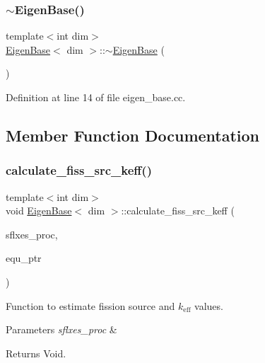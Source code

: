 \subsubsection{\texorpdfstring{$\sim$\+Eigen\+Base()}{~EigenBase()}}
{\footnotesize\ttfamily template$<$int dim$>$ \\
\hyperlink{class_eigen_base}{Eigen\+Base}$<$ dim $>$\+::$\sim$\hyperlink{class_eigen_base}{Eigen\+Base} (\begin{DoxyParamCaption}{ }\end{DoxyParamCaption})\hspace{0.3cm}{\ttfamily [virtual]}}



Definition at line 14 of file eigen\+\_\+base.\+cc.



\subsection{Member Function Documentation}
\mbox{\label{class_eigen_base_a325ceda011337e2416cef726bbd5d28f}} 
\subsubsection{\texorpdfstring{calculate\+\_\+fiss\+\_\+src\+\_\+keff()}{calculate\_fiss\_src\_keff()}}
{\footnotesize\ttfamily template$<$int dim$>$ \\
void \hyperlink{class_eigen_base}{Eigen\+Base}$<$ dim $>$\+::calculate\+\_\+fiss\+\_\+src\+\_\+keff (\begin{DoxyParamCaption}\item[{std\+::vector$<$ Vector$<$ double $>$ $>$ \&}]{sflxes\+\_\+proc,  }\item[{std\+\_\+cxx11\+::shared\+\_\+ptr$<$ \hyperlink{class_equation_base}{Equation\+Base}$<$ dim $>$ $>$}]{equ\+\_\+ptr }\end{DoxyParamCaption})\hspace{0.3cm}{\ttfamily [protected]}}

Function to estimate fission source and $k_\mathrm{eff}$ values.


\begin{DoxyParams}{Parameters}
{\em sflxes\+\_\+proc} & \\
\hline
\end{DoxyParams}
\begin{DoxyReturn}{Returns}
Void. 
\end{DoxyReturn}


